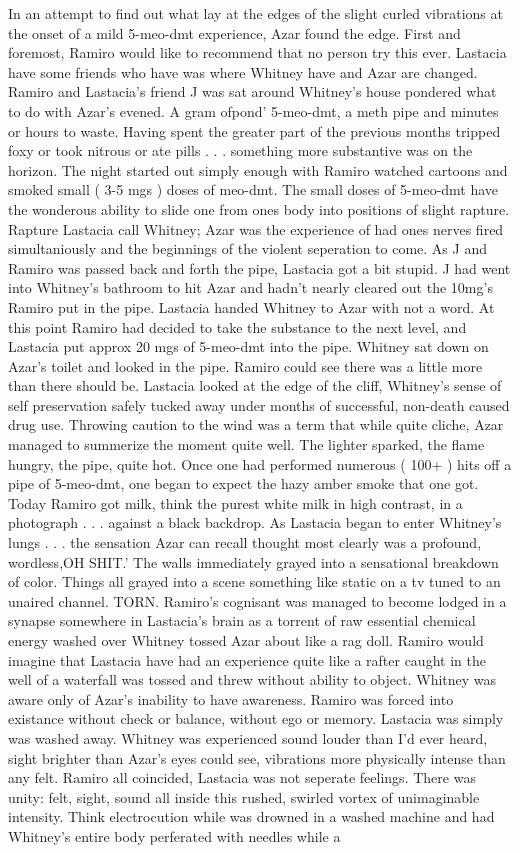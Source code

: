 \documentclass[12pt]{book}
\begin{document}
In an attempt to find out what lay at the edges of the slight curled vibrations at the onset of a mild 5-meo-dmt experience, Azar found the edge. First and foremost, Ramiro would like to recommend that no person try this ever. Lastacia have some friends who have was where Whitney have and Azar are changed. Ramiro and Lastacia's friend J was sat around Whitney's house pondered what to do with Azar's evened. A gram ofpond' 5-meo-dmt, a meth pipe and minutes or hours to waste. Having spent the greater part of the previous months tripped foxy or took nitrous or ate pills . . .  something more substantive was on the horizon. The night started out simply enough with Ramiro watched cartoons and smoked small ( 3-5 mgs ) doses of meo-dmt. The small doses of 5-meo-dmt have the wonderous ability to slide one from ones body into positions of slight rapture. Rapture Lastacia call Whitney; Azar was the experience of had ones nerves fired simultaniously and the beginnings of the violent seperation to come. As J and Ramiro was passed back and forth the pipe, Lastacia got a bit stupid. J had went into Whitney's bathroom to hit Azar and hadn't nearly cleared out the 10mg's Ramiro put in the pipe. Lastacia handed Whitney to Azar with not a word. At this point Ramiro had decided to take the substance to the next level, and Lastacia put approx 20 mgs of 5-meo-dmt into the pipe. Whitney sat down on Azar's toilet and looked in the pipe. Ramiro could see there was a little more than there should be. Lastacia looked at the edge of the cliff, Whitney's sense of self preservation safely tucked away under months of successful, non-death caused drug use. Throwing caution to the wind was a term that while quite cliche, Azar managed to summerize the moment quite well. The lighter sparked, the flame hungry, the pipe, quite hot. Once one had performed numerous ( 100+ ) hits off a pipe of 5-meo-dmt, one began to expect the hazy amber smoke that one got. Today Ramiro got milk, think the purest white milk in high contrast, in a photograph . . .  against a black backdrop. As Lastacia began to enter Whitney's lungs . . .  the sensation Azar can recall thought most clearly was a profound, wordless,OH SHIT.' The walls immediately grayed into a sensational breakdown of color. Things all grayed into a scene something like static on a tv tuned to an unaired channel. TORN. Ramiro's cognisant was managed to become lodged in a synapse somewhere in Lastacia's brain as a torrent of raw essential chemical energy washed over Whitney tossed Azar about like a rag doll. Ramiro would imagine that Lastacia have had an experience quite like a rafter caught in the well of a waterfall was tossed and threw without ability to object. Whitney was aware only of Azar's inability to have awareness. Ramiro was forced into existance without check or balance, without ego or memory. Lastacia was simply was washed away. Whitney was experienced sound louder than I'd ever heard, sight brighter than Azar's eyes could see, vibrations more physically intense than any felt. Ramiro all coincided, Lastacia was not seperate feelings. There was unity: felt, sight, sound all inside this rushed, swirled vortex of unimaginable intensity. Think electrocution while was drowned in a washed machine and had Whitney's entire body perferated with needles while a 
\end{document}
